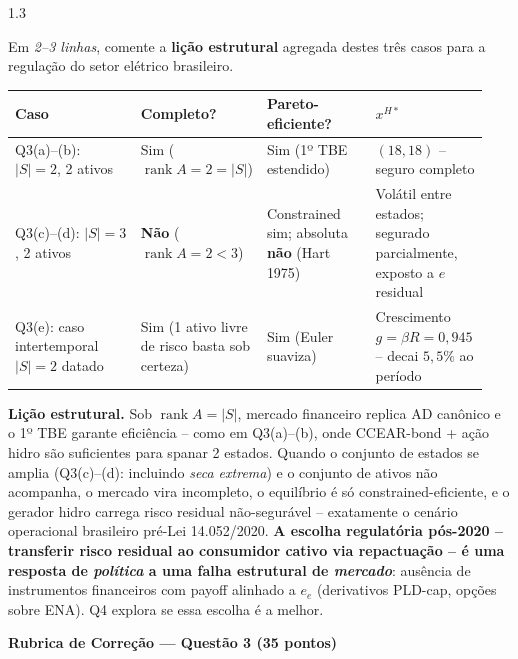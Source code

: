 \documentclass[11pt,addpoints]{exam}
\newcommand{\rank}{\operatorname{rank}}
\begin{document}
\begin{spacing}{1.3}
\begin{questions}
\begin{parts}
Em \emph{2--3 linhas}, comente a \textbf{lição estrutural} agregada destes três casos para a regulação do setor elétrico brasileiro.

\begin{solution}
\begin{center}
\renewcommand{\arraystretch}{1.4}
\small
\begin{tabular}{@{}p{0.28\linewidth}|p{0.18\linewidth}|p{0.24\linewidth}|p{0.24\linewidth}@{}}
\toprule
\textbf{Caso} & \textbf{Completo?} & \textbf{Pareto-eficiente?} & \textbf{$x^{H*}$} \\
\midrule
Q3(a)--(b): $|S|=2$, 2 ativos & Sim ($\rank A = 2 = |S|$) & Sim (1º TBE estendido) & $(18, 18)$ -- seguro completo \\
\midrule
Q3(c)--(d): $|S|=3$, 2 ativos & \textbf{Não} ($\rank A = 2 < 3$) & Constrained sim; absoluta \textbf{não} (Hart 1975) & Volátil entre estados; segurado parcialmente, exposto a $e$ residual \\
\midrule
Q3(e): caso intertemporal $|S|=2$ datado & Sim (1 ativo livre de risco basta sob certeza) & Sim (Euler suaviza) & Crescimento $g = \beta R = 0{,}945$ -- decai $5{,}5\%$ ao período \\
\bottomrule
\end{tabular}
\end{center}

\textbf{Lição estrutural.} Sob $\rank A = |S|$, mercado financeiro replica AD canônico e o 1º TBE garante eficiência -- como em Q3(a)--(b), onde CCEAR-bond + ação hidro são suficientes para spanar 2 estados. Quando o conjunto de estados se amplia (Q3(c)--(d): incluindo \emph{seca extrema}) e o conjunto de ativos não acompanha, o mercado vira incompleto, o equilíbrio é só constrained-eficiente, e o gerador hidro carrega risco residual não-segurável -- exatamente o cenário operacional brasileiro pré-Lei 14.052/2020. \textbf{A escolha regulatória pós-2020 -- transferir risco residual ao consumidor cativo via repactuação -- é uma resposta de \emph{política} a uma falha estrutural de \emph{mercado}}: ausência de instrumentos financeiros com payoff alinhado a $e_e$ (derivativos PLD-cap, opções sobre ENA). Q4 explora se essa escolha é a melhor.
\end{solution}

\end{parts}

\ifprintanswers
\vspace{1em}
{\color{rubred}
\noindent\textbf{Rubrica de Correção --- Questão 3 (35 pontos)}
\vspace{0.3em}

}
\end{questions}
\end{spacing}
\end{document}
